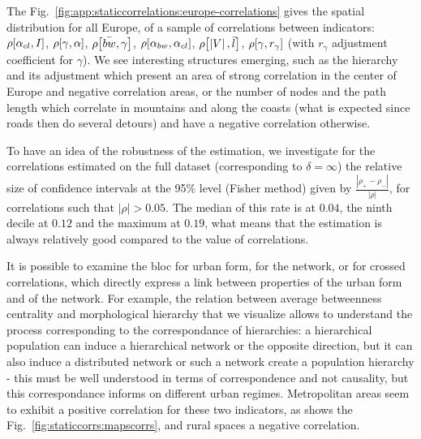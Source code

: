 The Fig.~\ref{fig:app:staticcorrelations:europe-correlations} gives the spatial distribution for all Europe, of a sample of correlations between indicators: $\rho\!\left[\alpha_{cl},I\right]$, $\rho\!\left[\gamma,\alpha\right]$, $\rho\!\left[\bar{bw},\gamma\right]$, $\rho\!\left[\alpha_{bw},\alpha_{cl}\right]$, $\rho\!\left[\left|V\right|,\bar{l}\right]$, $\rho\!\left[\gamma,r_{\gamma}\right]$ (with $r_{\gamma}$ adjustment coefficient for $\gamma$). We see interesting structures emerging, such as the hierarchy and its adjustment which present an area of strong correlation in the center of Europe and negative correlation areas, or the number of nodes and the path length which correlate in mountains and along the coasts (what is expected since roads then do several detours) and have a negative correlation otherwise.

To have an idea of the robustness of the estimation, we investigate for the correlations estimated on the full dataset (corresponding to $\delta = \infty$) the relative size of confidence intervals at the 95\% level (Fisher method) given by $\frac{\left|\rho_+ - \rho_-\right|}{\left|\rho\right|}$, for correlations such that $\left|\rho\right|>0.05$. The median of this rate is at $0.04$, the ninth decile at $0.12$ and the maximum at $0.19$, what means that the estimation is always relatively good compared to the value of correlations.



It is possible to examine the bloc for urban form, for the network, or for crossed correlations, which directly express a link between properties of the urban form and of the network. For example, the relation between average betweenness centrality and morphological hierarchy that we visualize allows to understand the process corresponding to the correspondance of hierarchies: a hierarchical population can induce a hierarchical network or the opposite direction, but it can also induce a distributed network or such a network create a population hierarchy - this must be well understood in terms of correspondence and not causality, but this correspondance informs on different urban regimes. Metropolitan areas seem to exhibit a positive correlation for these two indicators, as shows the Fig.~\ref{fig:staticcorrs:mapscorrs}, and rural spaces a negative correlation.


